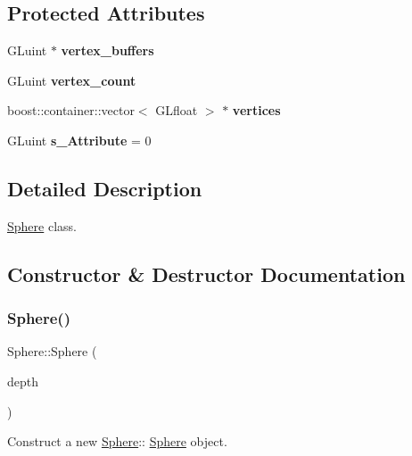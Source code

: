 \subsection*{Protected Attributes}
\begin{DoxyCompactItemize}
\item 
\mbox{\label{classSphere_a5808bbcad1a20c451692d31d07568312}} 
G\+Luint $\ast$ {\bfseries vertex\+\_\+buffers}
\item 
\mbox{\label{classSphere_a0938fd35dacfdcf91526b49e04567b5b}} 
G\+Luint {\bfseries vertex\+\_\+count}
\item 
\mbox{\label{classSphere_a030cc5c77a3d8fa634321e024e19cb90}} 
boost\+::container\+::vector$<$ G\+Lfloat $>$ $\ast$ {\bfseries vertices}
\item 
\mbox{\label{classSphere_a91ac121ef6f95cfb51ed505d339f9b84}} 
G\+Luint {\bfseries s\+\_\+\+Attribute} = 0
\end{DoxyCompactItemize}


\subsection{Detailed Description}
\mbox{\hyperlink{classSphere}{Sphere}} class. 



\subsection{Constructor \& Destructor Documentation}
\mbox{\label{classSphere_a1584cdd4253476e77d06f8e60b86da2e}} 
\subsubsection{\texorpdfstring{Sphere()}{Sphere()}}
{\footnotesize\ttfamily Sphere\+::\+Sphere (\begin{DoxyParamCaption}\item[{G\+Luint}]{depth }\end{DoxyParamCaption})\hspace{0.3cm}{\ttfamily [protected]}}



Construct a new \mbox{\hyperlink{classSphere}{Sphere}}\+:\+: \mbox{\hyperlink{classSphere}{Sphere}} object. 


